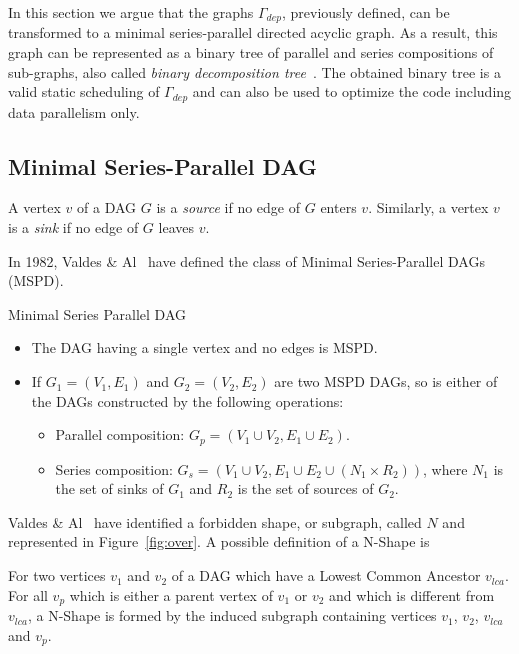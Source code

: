 In this section we argue that the graphs $\Gamma_{dep}$, previously defined, can be transformed to a minimal series-parallel directed acyclic graph. As a result, this graph can be represented as a binary tree of parallel and series compositions of sub-graphs, also called \emph{binary decomposition tree}~\cite{Valdes:1979:RSP:800135.804393}. The obtained binary tree is a valid static scheduling of $\Gamma_{dep}$ and can also be used to optimize the code including data parallelism only.

\subsection{Minimal Series-Parallel DAG}
\begin{mydef}
A vertex $v$ of a DAG $G$ is a \emph{source} if no edge of $G$ enters $v$. Similarly, a vertex $v$ is a \emph{sink} if no edge of $G$ leaves $v$. 
\end{mydef}

In 1982, Valdes \& Al~\cite{Valdes:1979:RSP:800135.804393} have defined the class of Minimal Series-Parallel DAGs (MSPD).

\begin{mydef}Minimal Series Parallel DAG
\begin{itemize}
\item The DAG having a single vertex and no edges is MSPD.
\item If $G_1=(V_1,E_1)$ and $G_2=(V_2,E_2)$ are two MSPD DAGs, so is either of the DAGs constructed by the following operations:
\begin{itemize}
\item Parallel composition: $G_p=(V_1\cup V_2,E_1\cup E_2)$.
\item Series composition: $G_s=(V_1\cup V_2,E_1\cup E_2\cup (N_1 \times R_2))$, where $N_1$ is the set of sinks of $G_1$ and $R_2$ is the set of sources of $G_2$.
\end{itemize}
\end{itemize}
\end{mydef}

Valdes \& Al~\cite{Valdes:1979:RSP:800135.804393} have identified a forbidden shape, or subgraph, called $N$ and represented in Figure~\ref{fig:over}. A possible definition of a N-Shape is
\begin{mydef}
For two vertices $v_1$ and $v_2$ of a DAG which have a Lowest Common Ancestor $v_{lca}$. For all $v_p$ which is either a parent vertex of $v_1$ or $v_2$ and which is different from $v_{lca}$, a N-Shape is formed by the induced subgraph containing vertices $v_1$, $v_2$, $v_{lca}$ and $v_p$.
\end{mydef}

